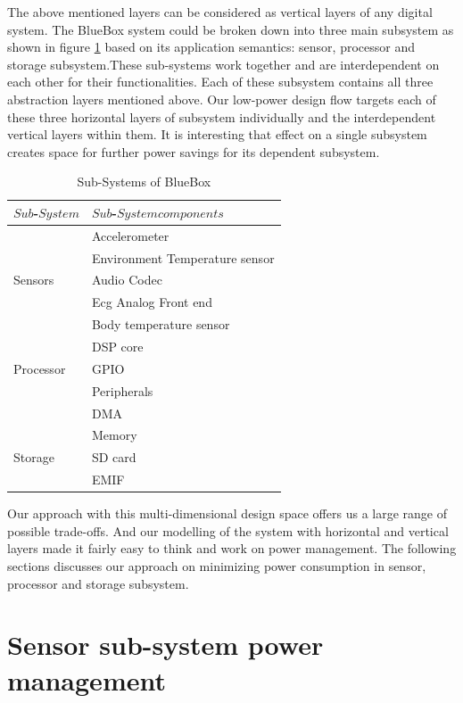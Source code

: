  
 The above mentioned layers can be considered as vertical layers of any digital system. The BlueBox system could be broken down into three main subsystem as shown in figure \ref{table:sub-system} based on its application semantics: sensor, processor and storage subsystem.These sub-systems work together and are interdependent on each other for their functionalities. Each of these subsystem contains  all three abstraction layers mentioned above. Our low-power design flow targets each of these three horizontal layers of subsystem individually and the interdependent  vertical layers within them. It is interesting that effect on a single subsystem creates space for further power savings for its dependent subsystem. 
 
  \begin{table}
 	\centering
 	\begin{tabular}{|l|l|}
 		\hline
 		$Sub$-$System$ & $Sub$-$System  components$  \\
 		\hline
 		& Accelerometer \\
 		& Environment Temperature sensor \\
 		Sensors & Audio Codec \\
 		& Ecg Analog Front end \\
 		& Body temperature sensor\\
 		\hline
 		& DSP core \\
 		Processor & GPIO \\
 		& Peripherals \\
 		& DMA \\
 		& Memory \\
 		\hline
 		Storage & SD card \\
 		& EMIF \\
 		\hline
 	\end{tabular}
 	\caption{Sub-Systems of BlueBox}
 	\label{table:sub-system}
 \end{table}
 
 
 Our approach with this multi-dimensional design space offers us a large range of possible trade-offs. And our modelling of the system with horizontal and vertical layers made it fairly easy to think and work on power management.
 The following sections discusses our approach on minimizing power consumption in sensor, processor and storage subsystem.
 
 \section{Sensor sub-system power management}
 
